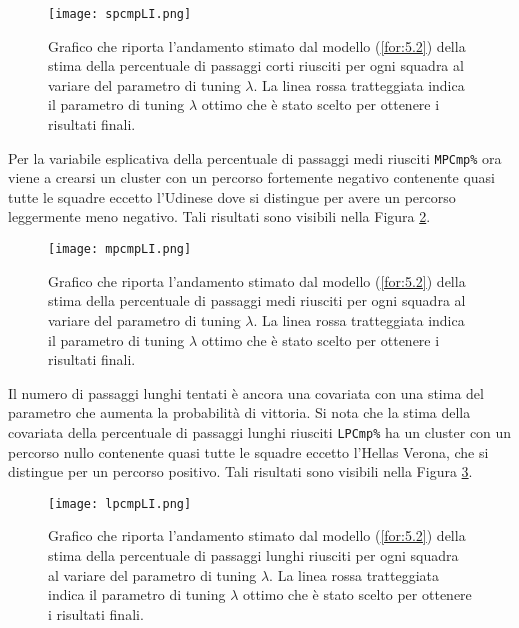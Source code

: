 \begin{figure}[htbp]
	\begin{center}
		\texttt{[image: spcmpLI.png]}
		\caption{Grafico che riporta l'andamento stimato dal modello (\ref{for:5.2}) della stima della percentuale di passaggi corti riusciti per ogni squadra al variare del parametro di tuning $\lambda$. La linea rossa tratteggiata indica il parametro di tuning $\lambda$ ottimo che è stato scelto per ottenere i risultati finali.} \label{fig:spcmpLI}
	\end{center}
\end{figure}
Per la variabile esplicativa della percentuale di passaggi medi riusciti \texttt{MPCmp\%} ora viene a crearsi un cluster con un percorso fortemente negativo contenente quasi tutte le squadre eccetto l'Udinese dove si distingue per avere un percorso leggermente meno negativo. Tali risultati sono visibili nella Figura \ref{fig:mpcmpLI}.\\
\begin{figure}[]
	\begin{center}
		\texttt{[image: mpcmpLI.png]}
		\caption{Grafico che riporta l'andamento stimato dal modello (\ref{for:5.2}) della stima della percentuale di passaggi medi riusciti per ogni squadra al variare del parametro di tuning $\lambda$. La linea rossa tratteggiata indica il parametro di tuning $\lambda$ ottimo che è stato scelto per ottenere i risultati finali.} \label{fig:mpcmpLI}
	\end{center}
\end{figure}
Il numero di passaggi lunghi tentati è ancora una covariata con una stima del parametro che aumenta la probabilità di vittoria. Si nota che la stima della covariata della percentuale di passaggi lunghi riusciti \texttt{LPCmp\%} ha un cluster con un percorso nullo contenente quasi tutte le squadre eccetto l'Hellas Verona, che si distingue per un percorso positivo. Tali risultati sono visibili nella Figura \ref{fig:lpcmpLI}.\\
\begin{figure}[htbp]
	\begin{center}
		\texttt{[image: lpcmpLI.png]}
		\caption{Grafico che riporta l'andamento stimato dal modello (\ref{for:5.2}) della stima della percentuale di passaggi lunghi riusciti per ogni squadra al variare del parametro di tuning $\lambda$. La linea rossa tratteggiata indica il parametro di tuning $\lambda$ ottimo che è stato scelto per ottenere i risultati finali.} \label{fig:lpcmpLI}
	\end{center}
\end{figure}
